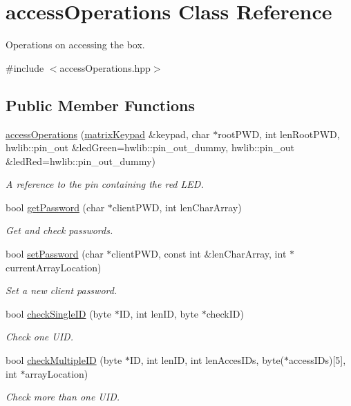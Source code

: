 \hypertarget{classaccess_operations}{}\section{access\+Operations Class Reference}
\label{classaccess_operations}


Operations on accessing the box.  




{\ttfamily \#include $<$access\+Operations.\+hpp$>$}

\subsection*{Public Member Functions}
\begin{DoxyCompactItemize}
\item 
\hyperlink{classaccess_operations_a42622d8277e50d7e01118139ab2fd57e}{access\+Operations} (\hyperlink{classmatrix_keypad}{matrix\+Keypad} \&keypad, char $\ast$root\+P\+WD, int len\+Root\+P\+WD, hwlib\+::pin\+\_\+out \&led\+Green=hwlib\+::pin\+\_\+out\+\_\+dummy, hwlib\+::pin\+\_\+out \&led\+Red=hwlib\+::pin\+\_\+out\+\_\+dummy)
\begin{DoxyCompactList}\small\item\em A reference to the pin containing the red L\+ED. \end{DoxyCompactList}\item 
bool \hyperlink{classaccess_operations_a23a9545b9b8636b995aa6e3d007ea524}{get\+Password} (char $\ast$client\+P\+WD, int len\+Char\+Array)
\begin{DoxyCompactList}\small\item\em Get and check passwords. \end{DoxyCompactList}\item 
bool \hyperlink{classaccess_operations_a93b1c64a9598739a34c09757fe1f4ac1}{set\+Password} (char $\ast$client\+P\+WD, const int \&len\+Char\+Array, int $\ast$current\+Array\+Location)
\begin{DoxyCompactList}\small\item\em Set a new client password. \end{DoxyCompactList}\item 
bool \hyperlink{classaccess_operations_a44956d25fa01c97b6755fbbc30fa7bf7}{check\+Single\+ID} (byte $\ast$ID, int len\+ID, byte $\ast$check\+ID)
\begin{DoxyCompactList}\small\item\em Check one U\+ID. \end{DoxyCompactList}\item 
bool \hyperlink{classaccess_operations_aa1967ef877d37bf37721cde1e41665b0}{check\+Multiple\+ID} (byte $\ast$ID, int len\+ID, int len\+Acces\+I\+Ds, byte($\ast$access\+I\+Ds)\mbox{[}5\mbox{]}, int $\ast$array\+Location)
\begin{DoxyCompactList}\small\item\em Check more than one U\+ID. \end{DoxyCompactList}\end{DoxyCompactItemize}


